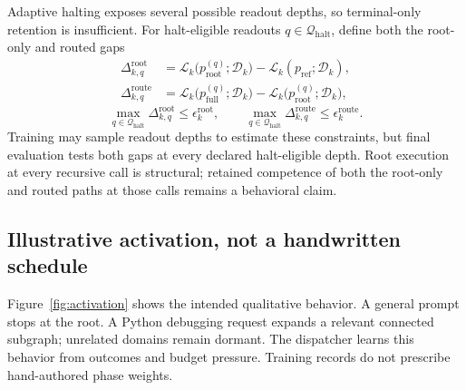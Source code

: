 \documentclass[10pt,a4paper]{article}
\newcommand{\eps}{\epsilon}
\newcommand{\Lcal}{\mathcal{L}}
\newcommand{\Dcal}{\mathcal{D}}
\newcommand{\Qcal}{\mathcal{Q}}
\begin{document}
Adaptive halting exposes several possible readout depths, so terminal-only
retention is insufficient. For halt-eligible readouts $q \in \Qcal_{\mathrm{halt}}$,
define both the root-only and routed gaps
\begin{align}
\Delta^{\mathrm{root}}_{k,q} &= \Lcal_k\bigl(p^{(q)}_{\mathrm{root}}; \Dcal_k\bigr)
  - \Lcal_k(p_{\mathrm{ref}}; \Dcal_k), \\
\Delta^{\mathrm{route}}_{k,q} &= \Lcal_k\bigl(p^{(q)}_{\mathrm{full}}; \Dcal_k\bigr)
  - \Lcal_k\bigl(p^{(q)}_{\mathrm{root}}; \Dcal_k\bigr),
\end{align}
\begin{equation}
\max_{q \in \Qcal_{\mathrm{halt}}} \Delta^{\mathrm{root}}_{k,q}
  \le \eps^{\mathrm{root}}_k,
\qquad
\max_{q \in \Qcal_{\mathrm{halt}}} \Delta^{\mathrm{route}}_{k,q}
  \le \eps^{\mathrm{route}}_k .
\label{eq:haltgaps}
\end{equation}
Training may sample readout depths to estimate these constraints, but final
evaluation tests both gaps at every declared halt-eligible depth. Root
execution at every recursive call is structural; retained competence of both
the root-only and routed paths at those calls remains a behavioral claim.

\subsection{Illustrative activation, not a handwritten schedule}

Figure~\ref{fig:activation} shows the intended qualitative behavior. A general
prompt stops at the root. A Python debugging request expands a relevant
connected subgraph; unrelated domains remain dormant. The dispatcher learns
this behavior from outcomes and budget pressure. Training records do not
prescribe hand-authored phase weights.
\end{document}
